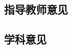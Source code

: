 \documentclass[AutoFakeBold]{ZafuResearchProposal}
\begin{document}
\begin{RPSectionBox}
    \section{指导教师意见}
\end{RPSectionBox}

\begin{RPSectionBox}
    \section{学科意见}    
\end{RPSectionBox}
\end{document}
